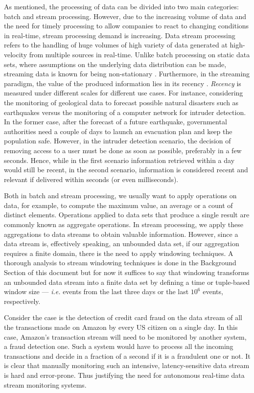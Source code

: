 As mentioned, the processing of data can be divided into two main categories: batch and stream processing. However, due to the increasing volume of data and the need for timely processing to allow companies to react to changing conditions in real-time, stream processing demand is increasing. Data stream processing refers to the handling of huge volumes of high variety of data generated at high-velocity from multiple sources in real-time. Unlike batch processing on static data sets, where assumptions on the underlying data distribution can be made, streaming data is known for being non-stationary \cite{Gama-Knowledge-Discovery}. Furthermore, in the streaming paradigm, the value of the produced information lies in its recency \cite{Kolajo-Big-data-stream-SLR}. \textit{Recency} is measured under different scales for different use cases. For instance, considering the monitoring of geological data to forecast possible natural disasters such as earthquakes versus the monitoring of a computer network for intruder detection. In the former case, after the forecast of a future earthquake, governmental authorities need a couple of days to launch an evacuation plan and keep the population safe. However, in the intruder detection scenario, the decision of removing access to a user must be done as soon as possible, preferably in a few seconds. Hence, while in the first scenario information retrieved within a day would still be recent, in the second scenario, information is considered recent and relevant if delivered within seconds (or even milliseconds).

Both in batch and stream processing, we usually want to apply operations on data, for example, to compute the maximum value, an average or a count of distinct elements. Operations applied to data sets that produce a single result are commonly known as aggregate operations. In stream processing, we apply these aggregations to data streams to obtain valuable information. However, since a data stream is, effectively speaking, an unbounded data set, if our aggregation requires a finite domain, there is the need to apply windowing techniques. A thorough analysis to stream windowing techniques is done in the Background Section of this document but for now it suffices to say that windowing transforms an unbounded data stream into a finite data set by defining a time or tuple-based window size --- \textit{i.e.} events from the last three days or the last $10^6$ events, respectively.

Consider the case is the detection of credit card fraud on the data stream of all the transactions made on Amazon by every US citizen on a single day. In this case, Amazon's transaction stream will need to be monitored by another system, a fraud detection one. Such a system would have to process all the incoming transactions and decide in a fraction of a second if it is a fraudulent one or not. It is clear that manually monitoring such an intensive, latency-sensitive data stream is hard and error-prone. Thus justifying the need for autonomous real-time data stream monitoring systems.

